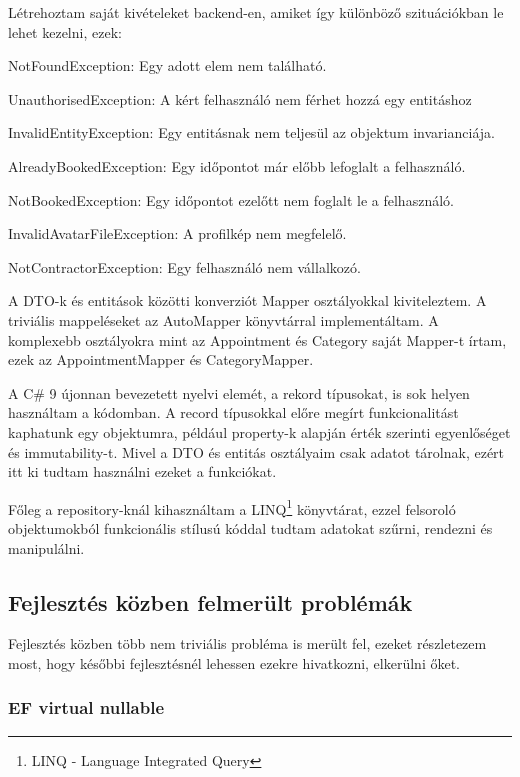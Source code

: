 Létrehoztam saját kivételeket backend-en, amiket így különböző szituációkban le lehet kezelni, ezek:

\begin{compactitem}
	\item NotFoundException: Egy adott elem nem található.
	\item UnauthorisedException: A kért felhasználó nem férhet hozzá egy entitáshoz
	\item InvalidEntityException: Egy entitásnak nem teljesül az objektum invarianciája.
	\item AlreadyBookedException: Egy időpontot már előbb lefoglalt a felhasználó.
	\item NotBookedException: Egy időpontot ezelőtt nem foglalt le a felhasználó.
	\item InvalidAvatarFileException: A profilkép nem megfelelő.
	\item NotContractorException: Egy felhasználó nem vállalkozó.
\end{compactitem}

A DTO-k és entitások közötti konverziót Mapper osztályokkal kiviteleztem. A triviális mappeléseket az AutoMapper könyvtárral implementáltam. A komplexebb osztályokra mint az Appointment és Category saját Mapper-t írtam, ezek az AppointmentMapper és CategoryMapper.

A C\# 9 újonnan bevezetett nyelvi elemét, a rekord típusokat, is sok helyen használtam a kódomban. A record típusokkal előre megírt funkcionalitást kaphatunk egy objektumra, például property-k alapján érték szerinti egyenlőséget és immutability-t. Mivel a DTO és entitás osztályaim csak adatot tárolnak, ezért itt ki tudtam használni ezeket a funkciókat.

Főleg a repository-knál kihasználtam a LINQ\footnote{LINQ - Language Integrated Query} könyvtárat, ezzel felsoroló objektumokból funkcionális stílusú kóddal tudtam adatokat szűrni, rendezni és manipulálni.

\subsection{Fejlesztés közben felmerült problémák}
\label{sec:devProblems}
Fejlesztés közben több nem triviális probléma is merült fel, ezeket részletezem most, hogy későbbi fejlesztésnél lehessen ezekre hivatkozni, elkerülni őket.

\subsubsection{EF virtual nullable}

